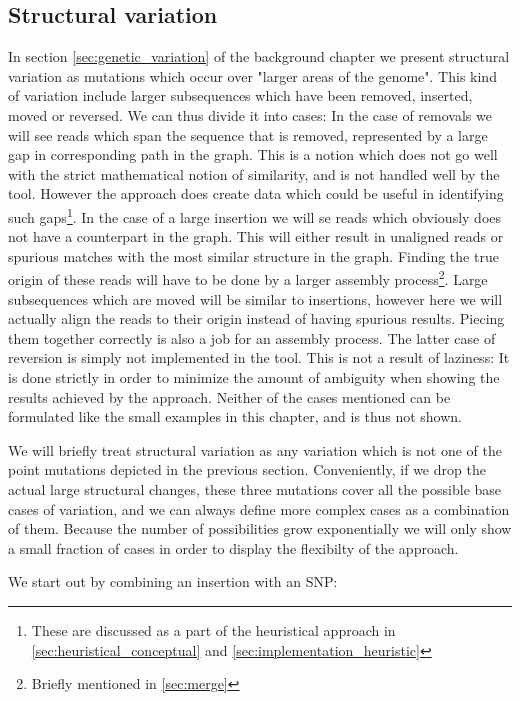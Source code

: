\documentclass[thesis.tex]{subfiles}
\begin{document}
\subsection*{Structural variation}
In section \ref{sec:genetic_variation} of the background chapter we present structural variation as mutations which occur over "larger areas of the genome". This kind of variation include larger subsequences which have been removed, inserted, moved or reversed. We can thus divide it into cases: In the case of removals we will see reads which span the sequence that is removed, represented by a large gap in corresponding path in the graph. This is a notion which does not go well with the strict mathematical notion of similarity, and is not handled well by the tool. However the approach does create data which could be useful in identifying such gaps\footnote{These are discussed as a part of the heuristical approach in \ref{sec:heuristical_conceptual} and \ref{sec:implementation_heuristic}}. In the case of a large insertion we will se reads which obviously does not have a counterpart in the graph. This will either result in unaligned reads or spurious matches with the most similar structure in the graph. Finding the true origin of these reads will have to be done by a larger assembly process\footnote{Briefly mentioned in \ref{sec:merge}}. Large subsequences which are moved will be similar to insertions, however here we will actually align the reads to their origin instead of having spurious results. Piecing them together correctly is also a job for an assembly process. The latter case of reversion is simply not implemented in the tool. This is not a result of laziness: It is done strictly in order to minimize the amount of ambiguity when showing the results achieved by the approach. Neither of the cases mentioned can be formulated like the small examples in this chapter, and is thus not shown.\\
\par\noindent
We will briefly treat structural variation as any variation which is not one of the point mutations depicted in the previous section. Conveniently, if we drop the actual large structural changes, these three mutations cover all the possible base cases of variation, and we can always define more complex cases as a combination of them. Because the number of possibilities grow exponentially we will only show a small fraction of cases in order to display the flexibilty of the approach.\\
\par\noindent
We start out by combining an insertion with an SNP:\\
\end{document}
